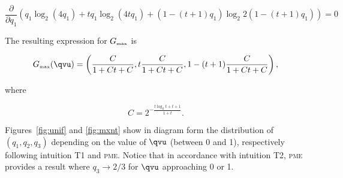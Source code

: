 \documentclass[phd,12pt,oneside]{ubcthesis}
\begin{document}
\begin{equation}
  \label{eq:ohyooquo}
\frac{\partial}{\partial{}q_{1}}(q_{1}\log_{2}(4q_{1})+tq_{1}\log_{2}(4tq_{1})+(1-(t+1)q_{1})\log_{2}2(1-(t+1)q_{1}))=0
\end{equation}

{\noindent}The resulting expression for $G_{\mbox{\tiny max}}$ is

\begin{equation}
  \label{eq:ahkoonae}
  G_{\mbox{\tiny max}}({\qvu})=\left(\frac{C}{1+Ct+C},t\frac{C}{1+Ct+C},1-(t+1)\frac{C}{1+Ct+C}\right),
\end{equation}

{\noindent}where

\begin{equation}
  \label{eq:johvulat}
  C=2^{-\frac{t\log_{2}t+t+1}{1+t}}.
\end{equation}


Figures~\ref{fig:unif} and \ref{fig:mxnt} show in diagram form the
distribution of $(q_{1},q_{2},q_{3})$ depending on the value of ${\qvu}$
(between 0 and 1), respectively following intuition T1 and
\textsc{pme}. Notice that in accordance with intuition T2,
\textsc{pme} provides a result where $q_{3}\rightarrow{}2/3$ for
${\qvu}$ approaching 0 or 1.
\end{document}
